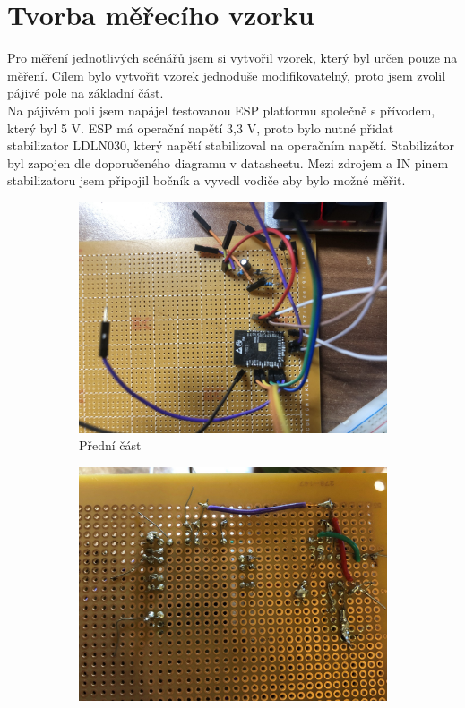 \documentclass[a4paper, 12pt]{report}
\begin{document}
    \section{Tvorba měřecího vzorku}
    Pro měření jednotlivých scénářů jsem si vytvořil vzorek, který byl určen pouze na měření. Cílem bylo vytvořit vzorek jednoduše modifikovatelný, proto jsem zvolil pájivé pole na základní část.\\
    Na pájivém poli jsem napájel testovanou ESP platformu společně s přívodem, který byl 5 V. ESP má operační napětí 3,3 V, proto bylo nutné přidat stabilizator LDLN030, který napětí stabilizoval na operačním napětí. Stabilizátor byl zapojen dle doporučeného diagramu v datasheetu. Mezi zdrojem a IN pinem stabilizatoru jsem připojil bočník a vyvedl vodiče aby bylo možné měřit.
    \begin{figure}[h!]
        \centering
        \begin{subfigure}[b]{0.4\linewidth}
            \includegraphics[width=\linewidth]{images/zapojeni_esp32_vzorek}
            \caption{Přední část}
        \end{subfigure}
        \begin{subfigure}[b]{0.4\linewidth}
            \includegraphics[width=\linewidth]{images/zapojeni_esp32_vzorek_zadek}

\end{subfigure}
\end{figure}
\end{document}
